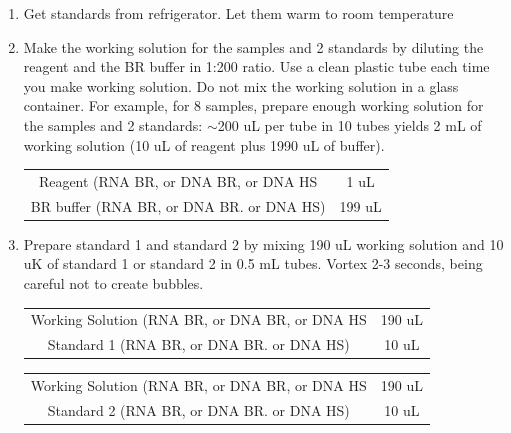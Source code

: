 \documentclass[11pt, oneside]{article}
\begin{document}
		\begin{enumerate}
			\item Get standards from refrigerator. Let them warm to room temperature
			\item Make the working solution for the samples and 2 standards by diluting the reagent and the BR buffer in 1:200 ratio.  Use a clean plastic 			tube each time you make working solution. Do not mix the working solution in a glass container. For example, for 8 samples, prepare enough 			working solution for the samples and 2 standards: $\sim$200 uL per tube in 10 tubes yields 2 mL of working solution (10 uL of reagent plus 			1990 uL of buffer).
		
			\begin{table}[h]
				\centering
				\begin{tabular}{| c | c |}
				\hline
				\cellcolor{gray}{\bf Reagent} & \cellcolor{gray}{\bf Number of samples 1X (uL)}  \\
				\hline
				Reagent (RNA BR, or DNA BR, or DNA HS & 1 uL \\
				BR buffer (RNA BR, or DNA BR. or  DNA HS) & 199 uL \\
				\hline
				\end{tabular}
			\end{table}

			\item Prepare standard 1 and standard 2 by mixing 190 uL working solution and 10 uK of standard 1 or standard 2 in 0.5 mL tubes. Vortex 2-3 			seconds, being careful not to create bubbles. 
		
			\begin{table}[h]
				\centering
				\begin{tabular}{| c | c |}
				\hline
				\cellcolor{gray}{\bf Reagent} & \cellcolor{gray}{\bf Number of samples 1X (uL)}  \\
				\hline
				Working Solution (RNA BR, or DNA BR, or DNA HS & 190 uL \\
				Standard 1 (RNA BR, or DNA BR. or  DNA HS) & 10 uL \\
				\hline
				\end{tabular}
			\end{table}

			\begin{table}[h]
				\centering
				\begin{tabular}{| c | c |}
				\hline
				\cellcolor{gray}{\bf Reagent} & \cellcolor{gray}{\bf Number of samples 1X (uL)}  \\
				\hline
				Working Solution (RNA BR, or DNA BR, or DNA HS & 190 uL \\
				Standard 2 (RNA BR, or DNA BR. or  DNA HS) & 10 uL \\
				\hline
				\end{tabular}
			\end{table}


\end{enumerate}
\end{document}
